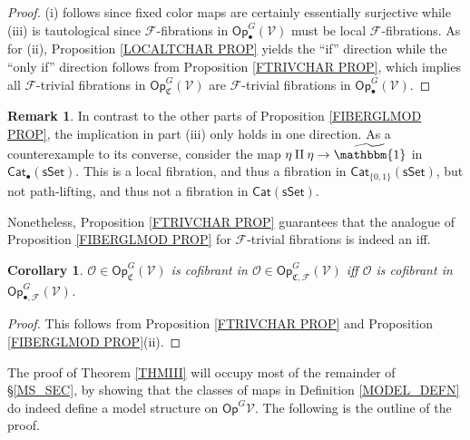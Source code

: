 \documentclass[a4paper,10pt
,draft
]{article}%
\numberwithin{equation}{section}
\numberwithin{figure}{section}
\newtheorem{corollary}[equation]{Corollary}%
\theoremstyle{definition} %
\newtheorem{remark}[equation]{Remark}%
\newcommand{\Op}{\mathsf{Op}}%
\newcommand{\F}{\ensuremath{\mathcal F}}
\newcommand{\V}{\ensuremath{\mathcal V}}
\renewcommand{\O}{\ensuremath{\mathcal O}}
\newcommand{\1}{\ensuremath{\mathbbm 1}}%
\begin{document}
\begin{proof}
	(i) follows since fixed color maps are certainly essentially surjective while (iii) is tautological since 
	$\F$-fibrations in $\mathsf{Op}_{\bullet}^G(\V)$ must be local $\F$-fibrations.
	As for (ii), 
	Proposition \ref{LOCALTCHAR PROP} yields the ``if'' direction
	while the ``only if'' direction follows from 
	Proposition \ref{FTRIVCHAR PROP}, 
	which implies all $\F$-trivial fibrations in $\mathsf{Op}_{\mathfrak{C}}^G(\V)$
	are $\F$-trivial fibrations in 
	$\mathsf{Op}_{\bullet}^G(\V)$.
\end{proof}


\begin{remark}
In contrast to the other parts of 
Proposition \ref{FIBERGLMOD PROP},
the implication in part (iii) 
only holds in one direction. 
As a counterexample to its converse, 
consider the map $\eta \amalg \eta \to \widetilde{\mathbbm{1}}$
in $\mathsf{Cat}_{\bullet}(\mathsf{sSet})$. This is a local fibration, 
and thus a fibration in $\mathsf{Cat}_{\{0,1\}}(\mathsf{sSet})$,
but not path-lifting, and thus not a fibration in $\mathsf{Cat}(\mathsf{sSet})$.

Nonetheless, Proposition \ref{FTRIVCHAR PROP}
guarantees that the analogue of Proposition \ref{FIBERGLMOD PROP}
for $\F$-trivial fibrations is indeed an iff.
\end{remark}



\begin{corollary}
      $\O \in \Op^G_{\mathfrak C}(\V)$ is cofibrant in
      $\O \in \Op^G_{\mathfrak C,\mathcal{F}}(\V)$
      iff $\O$ is cofibrant in $\Op^G_{\bullet,\F}(\V)$.
\end{corollary}

\begin{proof}
      This follows from Proposition \ref{FTRIVCHAR PROP} and Proposition \ref{FIBERGLMOD PROP}(ii).
\end{proof}


The proof of Theorem \ref{THMIII} will occupy most of 
the remainder of \S \ref{MS_SEC},
by showing that the classes of maps in Definition \ref{MODEL_DEFN}
do indeed define a model structure on $\mathsf{Op}^G{\V}$.
The following is the outline of the proof.
\end{document}
